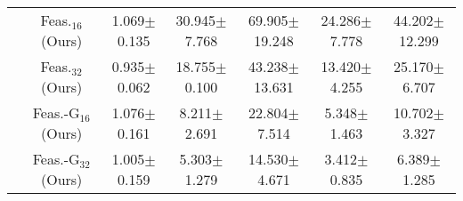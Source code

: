 \begin{table*}[t]
{\begin{tabular}{ccccccc}
\cmidrule{2-7}
& Feas.$_{16}$ (Ours) & 1.069\scriptsize$\pm$0.135 & 30.945\scriptsize$\pm$7.768 & 69.905\scriptsize$\pm$19.248
& 24.286\scriptsize$\pm$7.778 & 44.202\scriptsize$\pm$12.299 \\
& Feas.$_{32}$ (Ours) & 0.935\scriptsize$\pm$0.062 & 18.755\scriptsize$\pm$0.100 & 43.238\scriptsize$\pm$13.631
& 13.420\scriptsize$\pm$4.255 & 25.170\scriptsize$\pm$6.707 \\
& Feas.-G$_{16}$ (Ours) & 1.076\scriptsize$\pm$0.161 & 8.211\scriptsize$\pm$2.691 & 22.804\scriptsize$\pm$7.514
& 5.348\scriptsize$\pm$1.463 & 10.702\scriptsize$\pm$3.327 \\
& Feas.-G$_{32}$ (Ours) & 1.005\scriptsize$\pm$0.159 & 5.303\scriptsize$\pm$1.279 & 14.530\scriptsize$\pm$4.671
& 3.412\scriptsize$\pm$0.835 & 6.389\scriptsize$\pm$1.285 \\
\midrule


\end{tabular}}
\end{table*}

